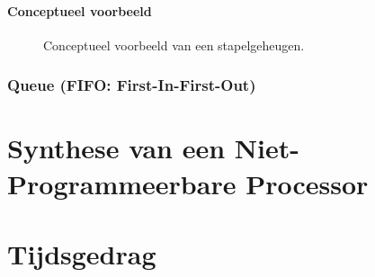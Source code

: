 \paragraph{Conceptueel voorbeeld}
\begin{figure}[hbt]
\centering
\subfigure[]{

}
\caption{Conceptueel voorbeeld van een stapelgeheugen.}
\end{figure}
\subsubsection{Queue (FIFO: First-In-First-Out)}
\section{Synthese van een Niet-Programmeerbare Processor}
\label{s:syntheseFSMD}
\section{Tijdsgedrag}
\label{s:timeFSMD}